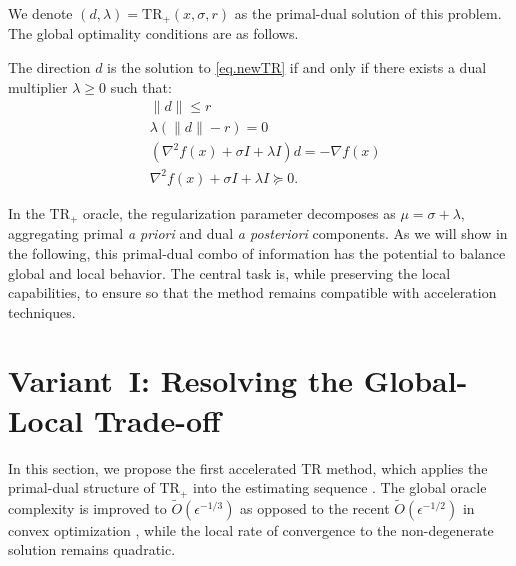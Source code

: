 \documentclass{mcom-l}
\newcommand{\cz}[1]{{\color{rosemary}\sffamily [#1]}}
\newcommand{\trp}{\textrm{TR}_+}
\numberwithin{equation}{section}
\begin{document}
We denote $(d,\lambda) = \trp(x,\sigma,r)$ as the primal-dual solution of this problem. The global optimality conditions are as follows.
\begin{lemma}\label{lem.optimal condition}
    The direction $d$ is the solution to \eqref{eq.newTR} if and only if there exists a dual multiplier $\lambda \geq 0$ such that: \begin{subequations}\label{eq.sa}
        \begin{align}
            \label{eq.optcond primal}
             & \| d\| \leq r                                                       \\
            \label{eq.optcond coml slack}
             & \lambda \left(\|d\|-r \right)=0                                     \\ \label{eq.optcond firstorder}
             & \left(\nabla^2 f(x) + \sigma I + \lambda I \right) d = -\nabla f(x) \\
            \label{eq.optcond secondorder}
             & \nabla^2 f(x) + \sigma I + \lambda I \succeq 0.
        \end{align}
    \end{subequations}
\end{lemma}
In the $\trp{}$ oracle, the regularization parameter decomposes as $\mu=\sigma+\lambda$, aggregating primal \emph{a priori} and dual \emph{a posteriori} components. As we will show in the following, this primal-dual combo of information has the potential to balance global and local behavior.
The central task is, while preserving the local capabilities, to ensure  so that the method remains compatible with acceleration techniques.



\section{Variant~I: Resolving the Global-Local Trade-off}\label{sec.first variant}
In this section, we propose the first accelerated TR method, which applies the primal-dual structure of $\trp$ into the estimating sequence \cite{nesterov2008accelerating}. The global oracle complexity is improved to $\tilde O(\epsilon^{-1/3})$ as opposed to the recent $\tilde O(\epsilon^{-1/2})$ in convex optimization \cite{jiang2024nonconvexityuniversaltrustregionmethod}, while the local rate of convergence to the non-degenerate solution remains quadratic.
\end{document}
